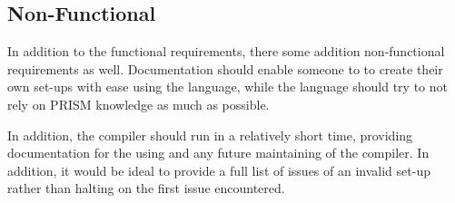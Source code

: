 \documentclass[report.tex]{subfiles}
\begin{document}
\subsection{Non-Functional} %
\label{sub:non_functional}
In addition to the functional requirements, there some addition non-functional
requirements as well. Documentation should enable someone to to create their own
set-ups with ease using the language, while the language should try to not rely
on PRISM knowledge as much as possible.

In addition, the compiler should run in a relatively short time, providing
documentation for the using and any future maintaining of the compiler. In
addition, it would be ideal to provide a full list of issues of an invalid
set-up rather than halting on the first issue encountered.
\newpage
\end{document}
